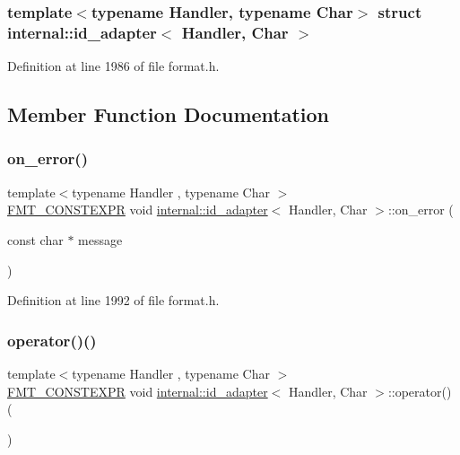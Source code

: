 \subsubsection*{template$<$typename Handler, typename Char$>$\newline
struct internal\+::id\+\_\+adapter$<$ Handler, Char $>$}



Definition at line 1986 of file format.\+h.



\subsection{Member Function Documentation}
\mbox{\label{structinternal_1_1id__adapter_a2e03feac07a2d549161205d50b96fe45}} 
\subsubsection{\texorpdfstring{on\+\_\+error()}{on\_error()}}
{\footnotesize\ttfamily template$<$typename Handler , typename Char $>$ \\
\hyperlink{core_8h_a69201cb276383873487bf68b4ef8b4cd}{F\+M\+T\+\_\+\+C\+O\+N\+S\+T\+E\+X\+PR} void \hyperlink{structinternal_1_1id__adapter}{internal\+::id\+\_\+adapter}$<$ Handler, Char $>$\+::on\+\_\+error (\begin{DoxyParamCaption}\item[{const char $\ast$}]{message }\end{DoxyParamCaption})\hspace{0.3cm}{\ttfamily [inline]}}



Definition at line 1992 of file format.\+h.

\mbox{\label{structinternal_1_1id__adapter_a28539391bce96a9118b6e21f2fccb888}} 
\subsubsection{\texorpdfstring{operator()()}{operator()()}\hspace{0.1cm}{\footnotesize\ttfamily [1/3]}}
{\footnotesize\ttfamily template$<$typename Handler , typename Char $>$ \\
\hyperlink{core_8h_a69201cb276383873487bf68b4ef8b4cd}{F\+M\+T\+\_\+\+C\+O\+N\+S\+T\+E\+X\+PR} void \hyperlink{structinternal_1_1id__adapter}{internal\+::id\+\_\+adapter}$<$ Handler, Char $>$\+::operator() (\begin{DoxyParamCaption}{ }\end{DoxyParamCaption})\hspace{0.3cm}{\ttfamily [inline]}}



